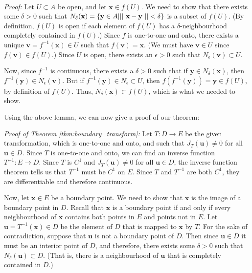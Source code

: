 \\

\noindent\emph{Proof:} Let $U\subset A$ be open, and let $\mathbf{x}\in f(U)$. We need to show that there exists some $\delta>0$ such that $N_\delta(\mathbf{x}) = \{\mathbf{y}\in A| ||\ \mathbf{x}-\mathbf{y}\ ||<\delta\}$ is a subset of $f(U)$. (By definition, $f(U)$ is open if each element of $f(U)$ has a $\delta$-neighbourhood completely contained in $f(U)$.) Since $f$ is one-to-one and onto, there exists a unique $\mathbf{v}=f^{-1}(\mathbf{x})\in U$ such that $f(\mathbf{v})=\mathbf{x}$. (We must have $\mathbf{v}\in U$ since $f(\mathbf{v})\in f(U)$.) Since $U$ is open, there exists an $\epsilon>0$ such that $N_\epsilon(\mathbf{v})\subset U$.

Now, since $f^{-1}$ is continuous, there exists a $\delta>0$ such that if $\mathbf{y}\in N_\delta(\mathbf{x})$, then $f^{-1}(\mathbf{y})\in N_\epsilon(\mathbf{v})$. But if $f^{-1}(\mathbf{y})\in N_\epsilon\subset U$, then $f(f^{-1}(\mathbf{y}))=\mathbf{y}\in f(U)$, by definition of $f(U)$. Thus, $N_\delta(\mathbf{x})\subset f(U)$, which is what we needed to show.

Using the above lemma, we can now give a proof of our theorem:

\noindent\emph{Proof of Theorem \ref{thm:boundary_transform}:}
Let $T:D\to E$ be the given transformation, which is one-to-one and onto, and such that $J_T(\mathbf{u})\neq 0$ for all $\mathbf{u}\in D$. Since $T$ is one-to-one and onto, we can find an inverse function $T^{-1}:E\to D$. Since $T$ is $C^1$ and $J_T(\mathbf{u})\neq 0$ for all $\mathbf{u}\in D$, the inverse function theorem tells us that $T^{-1}$ must be $C^1$ on $E$. Since $T$ and $T^{-1}$ are both $C^1$, they are differentiable and therefore continuous.

Now, let $\mathbf{x}\in E$ be a boundary point. We need to show that $\mathbf{x}$ is the image of a boundary point in $D$. Recall that $\mathbf{x}$ is a boundary point if and only if every neighbourhood of $\mathbf{x}$ contains both points in $E$ and points not in $E$. Let $\mathbf{u}=T^{-1}(\mathbf{x})\in D$ be the element of $D$ that is mapped to $\mathbf{x}$ by $T$. For the sake of contradiction, suppose that $\mathbf{u}$ is not a boundary point of $D$. Then since $\mathbf{u}\in D$ it must be an interior point of $D$, and therefore, there exists some $\delta>0$ such that $N_\delta(\mathbf{u})\subset D$. (That is, there is a neighbourhood of $\mathbf{u}$ that is completely contained in $D$.)

